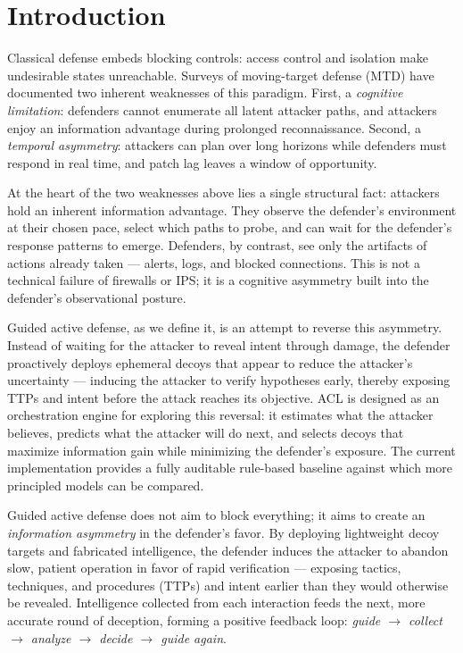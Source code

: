 \documentclass[preprints,article,accept,oneauthor]{Definitions/mdpi}
\begin{document}
\section{Introduction}
\label{sec:intro}

Classical defense embeds blocking controls: access control and isolation make
undesirable states unreachable. Surveys of moving-target defense (MTD) have
documented two inherent weaknesses of this paradigm. First, a
\textit{cognitive limitation}: defenders cannot enumerate all latent attacker
paths, and attackers enjoy an information advantage during prolonged
reconnaissance. Second, a \textit{temporal asymmetry}: attackers can plan
over long horizons while defenders must respond in real time, and patch lag
leaves a window of opportunity.

At the heart of the two weaknesses above lies a single structural fact: attackers hold an inherent information advantage. They observe the defender's environment at their chosen pace, select which paths to probe, and can wait for the defender's response patterns to emerge. Defenders, by contrast, see only the artifacts of actions already taken --- alerts, logs, and blocked connections. This is not a technical failure of firewalls or IPS; it is a cognitive asymmetry built into the defender's observational posture.

Guided active defense, as we define it, is an attempt to reverse this asymmetry. Instead of waiting for the attacker to reveal intent through damage, the defender proactively deploys ephemeral decoys that appear to reduce the attacker's uncertainty --- inducing the attacker to verify hypotheses early, thereby exposing TTPs and intent before the attack reaches its objective. ACL is designed as an orchestration engine for exploring this reversal: it estimates what the attacker believes, predicts what the attacker will do next, and selects decoys that maximize information gain while minimizing the defender's exposure. The current implementation provides a fully auditable rule-based baseline against which more principled models can be compared.

Guided active defense does not aim to block everything; it aims to create an
\textit{information asymmetry} in the defender's favor. By deploying
lightweight decoy targets and fabricated intelligence, the defender induces
the attacker to abandon slow, patient operation in favor of rapid
verification --- exposing tactics, techniques, and procedures (TTPs) and
intent earlier than they would otherwise be revealed. Intelligence collected
from each interaction feeds the next, more accurate round of deception,
forming a positive feedback loop: \textit{guide $\rightarrow$ collect
$\rightarrow$ analyze $\rightarrow$ decide $\rightarrow$ guide again}.
\end{document}

